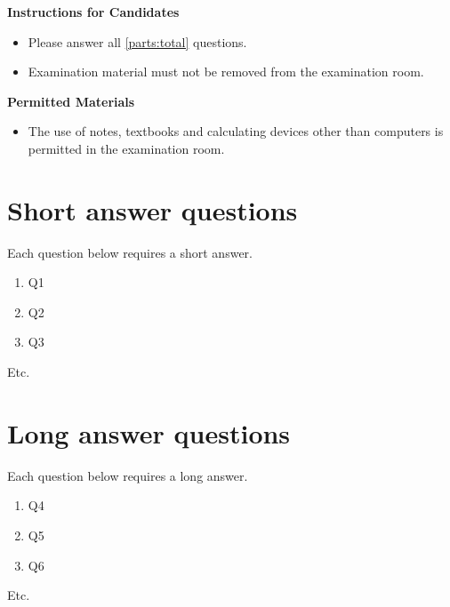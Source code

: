\documentclass{adelaide-mech-eng-exam}
\begin{document}
\begin{coverpage}

\textbf{Instructions for Candidates}
\begin{itemize}
\item Please answer all \ref{parts:total} questions.
\item Examination material must not be removed from the examination room.
\end{itemize}

\bigskip

\textbf{Permitted Materials}
\begin{itemize}
\item The use of notes, textbooks and calculating devices other than computers is permitted in the examination room.
\end{itemize}

\end{coverpage}

\section{Short answer questions}

Each question below requires a short answer.

\begin{enumerate}
\item
Q1
\item
Q2
\item
Q3
\end{enumerate}
Etc.

\TOTALMARKS

\clearpage
\section{Long answer questions}

Each question below requires a long answer.

\begin{enumerate}
\item
Q4
\item
Q5
\item
Q6
\end{enumerate}
Etc.

\TOTALMARKS

\COUNTMARKS
\end{document}
